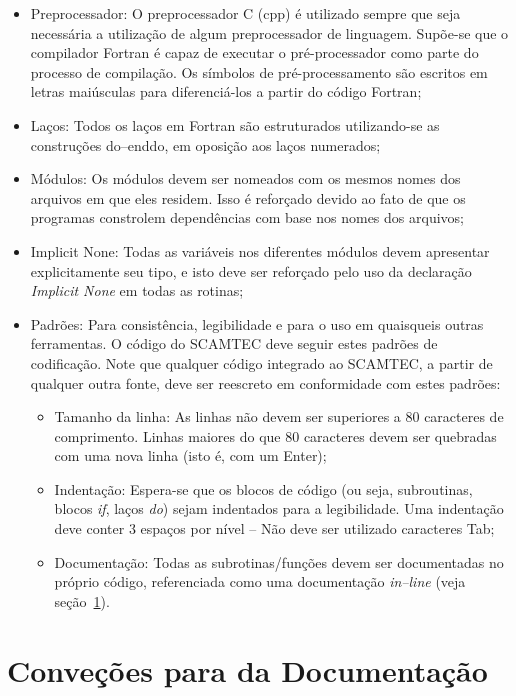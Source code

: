 \begin{itemize}
   \item Preprocessador: O preprocessador C (cpp) é utilizado sempre que seja necessária a utilização de algum preprocessador de linguagem. Supõe-se que o compilador Fortran é capaz de executar o pré-processador como parte do processo de compilação. Os símbolos de pré-processamento são escritos em letras maiúsculas para diferenciá-los a partir do código Fortran;
   \item Laços: Todos os laços em Fortran são estruturados utilizando-se as construções do--enddo, em oposição aos laços numerados;
   \item Módulos: Os módulos devem ser nomeados com os mesmos nomes dos arquivos em que eles residem. Isso é reforçado devido ao fato de que os programas constrolem dependências com base nos nomes dos arquivos;
   \item Implicit None: Todas as variáveis nos diferentes módulos devem apresentar explicitamente seu tipo, e isto deve ser reforçado pelo uso da declaração \textit{Implicit None} em todas as rotinas;
   \item Padrões: Para consistência, legibilidade e para o uso em quaisqueis outras ferramentas. O código do SCAMTEC deve seguir estes padrões de codificação. Note que qualquer código integrado ao SCAMTEC, a partir de qualquer outra fonte, deve ser reescreto em conformidade com estes padrões:
   \begin{itemize}
      \item Tamanho da linha: As linhas não devem ser superiores a 80 caracteres de comprimento. Linhas maiores do que 80 caracteres devem ser quebradas com uma nova linha (isto é, com um Enter);
      \item Indentação: Espera-se que os blocos de código (ou seja, subroutinas, blocos \textit{if}, laços \textit{do}) sejam indentados para a legibilidade. Uma indentação deve conter 3 espaços por nível -- Não deve ser utilizado caracteres Tab;
      \item Documentação: Todas as subrotinas/funções devem ser documentadas no próprio código, referenciada como uma documentação \textit{in--line} (veja seção~\ref{sec:documentacao}).
      \end{itemize}
\end{itemize}

\section{Conveções para da Documentação}
\label{sec:documentacao}
